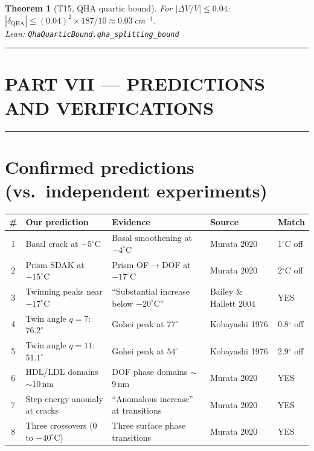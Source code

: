 \documentclass[11pt,a4paper]{article}
\newtheorem{theorem}{Theorem}
\begin{document}
\begin{theorem}[T15, QHA quartic bound]\label{thm:T15}
For $|\Delta V/V| \le 0.04$: $|\delta_\text{QHA}| \le (0.04)^2 \times 187/10 \approx 0.03$\,cm$^{-1}$.\\
{\small\emph{Lean: \texttt{QhaQuarticBound.qha\_splitting\_bound}}}
\end{theorem}

\hrule\vspace{14pt}

\section*{\centering PART VII — PREDICTIONS AND VERIFICATIONS}
\hrule\vspace{12pt}

\section{Confirmed predictions (vs.\ independent experiments)}

\begin{center}\small
\begin{tabular}{cllll}
\toprule
\# & Our prediction & Evidence & Source & Match \\
\midrule
1 & Basal crack at $-5^\circ$C & Basal smoothening at $-4^\circ$C & Murata 2020 & 1$^\circ$C off \\
2 & Prism SDAK at $-15^\circ$C & Prism OF$\to$DOF at $-17^\circ$C & Murata 2020 & 2$^\circ$C off \\
3 & Twinning peaks near $-17^\circ$C & ``Substantial increase below $-20^\circ$C'' & Bailey \& Hallett 2004 & YES \\
4 & Twin angle $q=7$: $76.2^\circ$ & Gohei peak at $77^\circ$ & Kobayashi 1976 & 0.8$^\circ$ off \\
5 & Twin angle $q=11$: $51.1^\circ$ & Gohei peak at $54^\circ$ & Kobayashi 1976 & 2.9$^\circ$ off \\
6 & HDL/LDL domains $\sim$10\,nm & DOF phase domains $\sim$9\,nm & Murata 2020 & YES \\
7 & Step energy anomaly at cracks & ``Anomalous increase'' at transitions & Murata 2020 & YES \\
8 & Three crossovers (0 to $-40^\circ$C) & Three surface phase transitions & Murata 2020 & YES \\
\bottomrule
\end{tabular}
\end{center}
\end{document}
